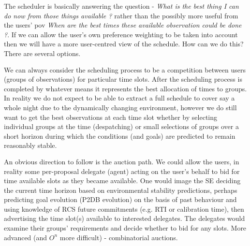 \begin{note}
The scheduler is basically answering the question - \emph{What is the best thing I can do now from those things available ?} rather than the possibly more useful from the users' pov \emph{When are the best times these available observation could be done ?}. If we can allow the user's own preference weighting to be taken into account then we will have a more user-centred view of the schedule. How can we do this? There are several options.

We can always consider the scheduling process to be a competition between users (groups of observations) for particular time slots. After the scheduling process is completed by whatever means it represents the best allocation of times to groups. In reality we do not expect to be able to extract a full schedule to cover say a whole night due to the dynamically changing environment, however we do still want to get the best observations at each time slot whether by selecting individual groups at the time (despatching) or small selections of groups over a short horizon during which the conditions (and goals) are predicted to remain reasonably stable. 

An obvious direction to follow is the auction path. We could allow the users, in reality some per-proposal delegate (agent) acting on the user's behalf to bid for time available slots as they became available. One would image the SE deciding the current time horizon based on environmental stability predictions, perhaps predicting goal evolution (P2DB evolution) on the basis of past behaviour and using knowledge of RCS future commitments (e.g. RTI or calibration time), then advertising the time slot(s) available to interested delegates. The delegates would examine their groups' requirements and decide whether to bid for any slots. More advanced (and $O^n$ more difficult) - combinatorial auctions.
\end{note}
